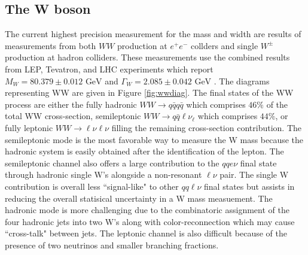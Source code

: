 
\subsection{The W boson}
\label{subsec:std_model}

 The current highest precision measurement for the mass and width are results of measurements from both $WW$ production at $e^+ e^-$ collders and single $W^\pm$ production at hadron colliders. These measurements use the combined results from LEP, Tevatron, and LHC experiments which report $M_W = 80.379 \pm 0.012 \, \, \text{GeV} $ and $\Gamma_W = 2.085 \pm 0.042 \,  \,\text{GeV}$ \cite{pdg}. The diagrams representing WW are given in Figure \ref{fig:wwdiag}. The final states of the WW process are either the fully hadronic $WW\rightarrow q\bar{q}q\bar{q}$ which comprises $46\%$ of the total WW cross-section, semileptonic $WW\rightarrow q\bar{q}\ell\nu_{\ell}$ which comprises $44\%$, or fully leptonic $WW\rightarrow \ell \nu \ell \nu$ filling the remaining cross-section contribution\cite{wwOPAL}. The semileptonic mode is the most favorable way to measure the W mass because the hadronic system is easily obtained after the identification of the lepton. The semileptonic channel also offers a large contribution to the $qqe\nu$ final state through hadronic single W's alongside a non-resonant $\ell \nu$ pair. The single W contribution is overall less ``signal-like" to other $qq\ell\nu$ final states but assists in reducing the overall statisical uncertainty in a W mass measuement. The hadronic mode is more challenging due to the combinatoric assignment of the four hadronic jets into two W's along with color-reconnection which may cause ``cross-talk" between jets. The leptonic channel is also difficult because of the presence of two neutrinos and smaller branching fractions.

